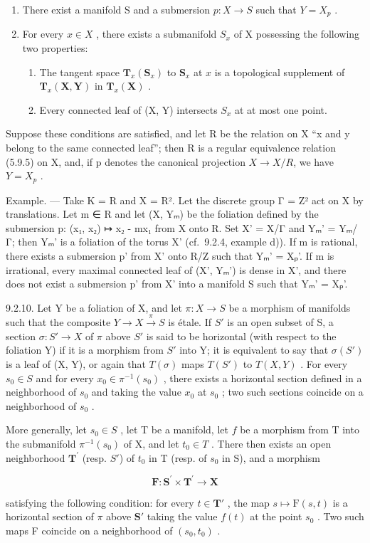 \begin{enumerate}
\def\labelenumi{\alph{enumi})}
\item
  There exist a manifold S and a submersion \(p: X \to S\) such that \(Y = X_p\) .
\item
  For every \(x \in X\) , there exists a submanifold \(S_{x}\) of X possessing the following two properties:
\begin{enumerate}
\item[\(b_1)\)] The tangent space \(\mathbf{T}_{x}(\mathbf{S}_{x})\) to \(\mathbf{S}_{x}\) at \(x\) is a topological supplement of \(\mathbf{T}_{x}(\mathbf{X},\mathbf{Y})\) in \(\mathbf{T}_{x}(\mathbf{X})\) .
\item[\(b_2)\)] Every connected leaf of (X, Y) intersects \(S_{x}\) at at most one point.
\end{enumerate}
\end{enumerate}

Suppose these conditions are satisfied, and let R be the relation on X “x and y belong to the same connected leaf”; then R is a regular equivalence relation (5.9.5) on X, and, if p denotes the canonical projection \(X \to X/R\), we have \(Y = X_p\) .

Example. --- Take K = R and X = R². Let the discrete group Γ = Z² act on X by translations. Let m ∈ R and let (X, Yₘ) be the foliation defined by the submersion p: (x₁, x₂) ↦ x₂ - mx₁ from X onto R. Set X' = X/Γ and Yₘ' = Yₘ/Γ; then Yₘ' is a foliation of the torus X' (cf.~9.2.4, example d)). If m is rational, there exists a submersion p' from X' onto R/Z such that Yₘ' = Xₚ'. If m is irrational, every maximal connected leaf of (X', Yₘ') is dense in X', and there does not exist a submersion p' from X' into a manifold S such that Yₘ' = Xₚ'.

9.2.10. Let Y be a foliation of X, and let \(\pi: X \to S\) be a morphism of manifolds such that the composite \(Y \to X \xrightarrow{\pi} S\) is étale. If \(S'\) is an open subset of S, a section \(\sigma: S' \to X\) of \(\pi\) above \(S'\) is said to be horizontal (with respect to the foliation Y) if it is a morphism from \(S'\) into Y; it is equivalent to say that \(\sigma(S')\) is a leaf of (X, Y), or again that \(T(\sigma)\) maps \(T(S')\) to \(T(X, Y)\) . For every \(s_0 \in S\) and for every \(x_0 \in \pi^{-1}(s_0)\) , there exists a horizontal section defined in a neighborhood of \(s_0\) and taking the value \(x_0\) at \(s_0\) ; two such sections coincide on a neighborhood of \(s_0\) .

More generally, let \(s_{0}\in S\) , let T be a manifold, let \(f\) be a morphism from T into the submanifold \(\pi^{-1}(s_{0})\) of X, and let \(t_{0}\in T\) . There then exists an open neighborhood \(\mathbf{T}^{\prime}\) (resp. \(S'\)) of \(t_{0}\) in T (resp. of \(s_{0}\) in S), and a morphism

\[
\mathbf {F}: \mathbf {S} ^ {\prime} \times \mathbf {T} ^ {\prime} \rightarrow \mathbf {X}
\]

satisfying the following condition: for every \(t \in \mathbf{T}'\) , the map \(s \mapsto \mathrm{F}(s, t)\) is a horizontal section of \(\pi\) above \(\mathbf{S}'\) taking the value \(f(t)\) at the point \(s_0\) . Two such maps F coincide on a neighborhood of \((s_0, t_0)\) .

